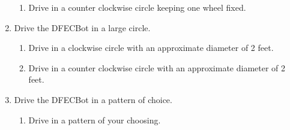 \documentclass{handout}
\begin{document}
\begin{enumerate}
\begin{enumerate}
			\item Drive in a counter clockwise circle keeping one wheel fixed.
		\end{enumerate}
		\item Drive the DFECBot in a large circle.
		\begin{enumerate}
			\item Drive in a clockwise circle with an approximate diameter of 2 feet.
			\item Drive in a counter clockwise circle with an approximate diameter of 2 feet.
		\end{enumerate}
		\item Drive the DFECBot in a pattern of choice.
		\begin{enumerate}
			\item Drive in a pattern of your choosing.
		\end{enumerate} 
	

\end{enumerate}


	
\end{document}
